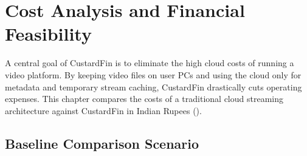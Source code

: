 
\chapter{Cost Analysis and Financial Feasibility}
\label{chap:cost_analysis}

A central goal of CustardFin is to eliminate the high cloud costs of running a video platform. By keeping video files on user PCs and using the cloud only for metadata and temporary stream caching, CustardFin drastically cuts operating expenses. This chapter compares the costs of a traditional cloud streaming architecture against CustardFin in Indian Rupees (\rupee).

\section{Baseline Comparison Scenario}
\label{sec:cost_methodology}

